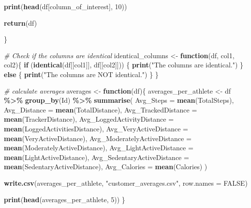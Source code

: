\documentclass[
]{article}
\newenvironment{Shaded}{\begin{snugshade}}{\end{snugshade}}
\newcommand{\AttributeTok}[1]{\textcolor[rgb]{0.13,0.29,0.53}{#1}}
\newcommand{\CommentTok}[1]{\textcolor[rgb]{0.56,0.35,0.01}{\textit{#1}}}
\newcommand{\ConstantTok}[1]{\textcolor[rgb]{0.56,0.35,0.01}{#1}}
\newcommand{\ControlFlowTok}[1]{\textcolor[rgb]{0.13,0.29,0.53}{\textbf{#1}}}
\newcommand{\DecValTok}[1]{\textcolor[rgb]{0.00,0.00,0.81}{#1}}
\newcommand{\FunctionTok}[1]{\textcolor[rgb]{0.13,0.29,0.53}{\textbf{#1}}}
\newcommand{\NormalTok}[1]{#1}
\newcommand{\OtherTok}[1]{\textcolor[rgb]{0.56,0.35,0.01}{#1}}
\newcommand{\SpecialCharTok}[1]{\textcolor[rgb]{0.81,0.36,0.00}{\textbf{#1}}}
\newcommand{\StringTok}[1]{\textcolor[rgb]{0.31,0.60,0.02}{#1}}
\begin{document}
\begin{Shaded}
\begin{Highlighting}[]
  \FunctionTok{print}\NormalTok{(}\FunctionTok{head}\NormalTok{(df[column\_of\_interest], }\DecValTok{10}\NormalTok{))}
  
  
  \FunctionTok{return}\NormalTok{(df)}
  
\NormalTok{\}}

\CommentTok{\# Check if the columns are identical}
\NormalTok{identical\_columns }\OtherTok{\textless{}{-}} \ControlFlowTok{function}\NormalTok{(df, col1, col2)\{}
  \ControlFlowTok{if}\NormalTok{ (}\FunctionTok{identical}\NormalTok{(df[[col1]], df[[col2]])) \{}
    \FunctionTok{print}\NormalTok{(}\StringTok{"The columns are identical."}\NormalTok{)}
\NormalTok{  \} }\ControlFlowTok{else}\NormalTok{ \{}
    \FunctionTok{print}\NormalTok{(}\StringTok{"The columns are NOT identical."}\NormalTok{)}
\NormalTok{  \} }
\NormalTok{\}}


\CommentTok{\# calculate averages}
\NormalTok{averages }\OtherTok{\textless{}{-}} \ControlFlowTok{function}\NormalTok{(df)\{}
\NormalTok{  averages\_per\_athlete }\OtherTok{\textless{}{-}}\NormalTok{ df }\SpecialCharTok{\%\textgreater{}\%}
    \FunctionTok{group\_by}\NormalTok{(Id)  }\SpecialCharTok{\%\textgreater{}\%}
      \FunctionTok{summarise}\NormalTok{(}
        \AttributeTok{Avg\_Steps =} \FunctionTok{mean}\NormalTok{(TotalSteps),}
        \AttributeTok{Avg\_Distance =} \FunctionTok{mean}\NormalTok{(TotalDistance),}
        \AttributeTok{Avg\_TrackedDistance =} \FunctionTok{mean}\NormalTok{(TrackerDistance),}
        \AttributeTok{Avg\_LoggedActivityDistance =} \FunctionTok{mean}\NormalTok{(LoggedActivitiesDistance),}
        \AttributeTok{Avg\_VeryActiveDistance =} \FunctionTok{mean}\NormalTok{(VeryActiveDistance),}
        \AttributeTok{Avg\_ModeratelyActiveDistance =} \FunctionTok{mean}\NormalTok{(ModeratelyActiveDistance),}
        \AttributeTok{Avg\_LightActiveDistance =} \FunctionTok{mean}\NormalTok{(LightActiveDistance),}
        \AttributeTok{Avg\_SedentaryActiveDistance =} \FunctionTok{mean}\NormalTok{(SedentaryActiveDistance),}
        \AttributeTok{Avg\_Calories =} \FunctionTok{mean}\NormalTok{(Calories)}
\NormalTok{    )}
  
  \FunctionTok{write.csv}\NormalTok{(averages\_per\_athlete, }\StringTok{"customer\_averages.csv"}\NormalTok{, }\AttributeTok{row.names =} \ConstantTok{FALSE}\NormalTok{)}
  
  \FunctionTok{print}\NormalTok{(}\FunctionTok{head}\NormalTok{(averages\_per\_athlete, }\DecValTok{5}\NormalTok{))}
\NormalTok{\}}



\end{Highlighting}
\end{Shaded}
\end{document}
